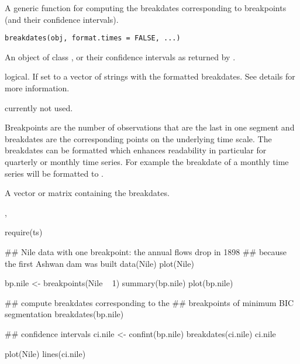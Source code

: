 \begin{Description}\relax
A generic function for computing the breakdates corresponding
to breakpoints (and their confidence intervals).\end{Description}
\begin{Usage}
\begin{verbatim}
breakdates(obj, format.times = FALSE, ...)
\end{verbatim}
\end{Usage}
\begin{Arguments}
\begin{ldescription}
\item[\code{obj}] An object of class ,  or their
confidence intervals as returned by .
\item[\code{format.times}] logical. If set to  a vector of
strings with the formatted breakdates. See details for more
information.
\item[\code{...}] currently not used.
\end{ldescription}
\end{Arguments}
\begin{Details}\relax
Breakpoints are the number of observations that are the last in one
segment and breakdates are the corresponding points on the underlying
time scale. The breakdates can be formatted which enhances readability
in particular for quarterly or monthly time series. For example the
breakdate  of a monthly time series will be formatted to
.\end{Details}
\begin{Value}
A vector or matrix containing the breakdates.\end{Value}
\begin{SeeAlso}\relax
{}, \end{SeeAlso}
\begin{Examples}
\begin{ExampleCode}
require(ts)

## Nile data with one breakpoint: the annual flows drop in 1898
## because the first Ashwan dam was built
data(Nile)
plot(Nile)

bp.nile <- breakpoints(Nile ~ 1)
summary(bp.nile)
plot(bp.nile)

## compute breakdates corresponding to the
## breakpoints of minimum BIC segmentation
breakdates(bp.nile)

## confidence intervals
ci.nile <- confint(bp.nile)
breakdates(ci.nile)
ci.nile

plot(Nile)
lines(ci.nile)
\end{ExampleCode}
\end{Examples}

